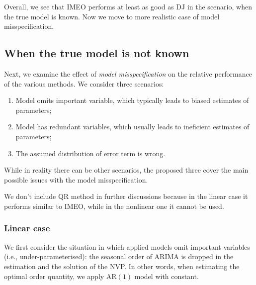 \documentclass[a4paper,11pt]{article}
\begin{document}
Overall, we see that IMEO performs at least as good as DJ in the scenario, when the true model is known. Now we move to more realistic case of model misspecification.


\subsection{When the true model is not known}

Next, we examine the effect of \emph{model misspecification} on the relative performance of the various methods. We consider three scenarios:
\begin{enumerate}
    \item Model omits important variable, which typically leads to biased estimates of parameters;
    \item Model has redundant variables, which usually leads to ineficient estimates of parameters;
    \item The assumed distribution of error term is wrong.
\end{enumerate}
While in reality there can be other scenarios, the proposed three cover the main possible issues with the model misspecification.

We don't include QR method in further discussions because in the linear case it performs similar to IMEO, while in the nonlinear one it cannot be used.


\subsubsection{Linear case} \label{sub:exp3}

We first consider the situation in which applied models omit important variables (i.e., under-parameterised): the seasonal order of ARIMA is dropped in the estimation and the solution of the NVP. In other words, when estimating the optimal order quantity, we apply AR$(1)$ model with constant.
\end{document}

